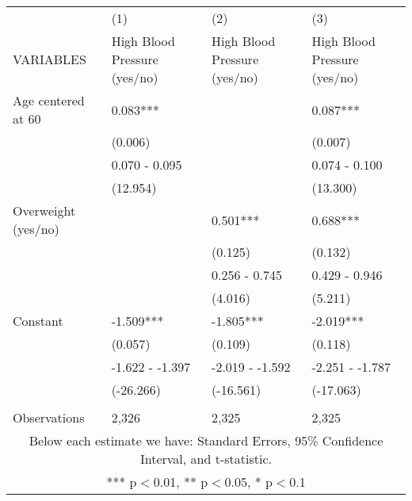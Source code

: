 \begin{tabular}{l*{3}{m{.2\linewidth}}} \hline
 & (1) & (2) & (3) \\
VARIABLES & High Blood Pressure (yes/no) & High Blood Pressure (yes/no) & High Blood Pressure (yes/no) \\ \hline
Age centered at 60 & 0.083*** &  & 0.087*** \\
 & (0.006) &  & (0.007) \\
 & 0.070 - 0.095 &  & 0.074 - 0.100 \\
 & (12.954) &  & (13.300) \\
Overweight (yes/no) &  & 0.501*** & 0.688*** \\
 &  & (0.125) & (0.132) \\
 &  & 0.256 - 0.745 & 0.429 - 0.946 \\
 &  & (4.016) & (5.211) \\
Constant & -1.509*** & -1.805*** & -2.019*** \\
 & (0.057) & (0.109) & (0.118) \\
 & -1.622 - -1.397 & -2.019 - -1.592 & -2.251 - -1.787 \\
 & (-26.266) & (-16.561) & (-17.063) \\
 &  &  &  \\
 Observations & 2,326 & 2,325 & 2,325 \\ \hline
\multicolumn{4}{c}{Below each estimate we have: Standard Errors, 95\% Confidence Interval, and t-statistic.} \\
\multicolumn{4}{c}{ *** p$<$0.01, ** p$<$0.05, * p$<$0.1} \\
\end{tabular}
